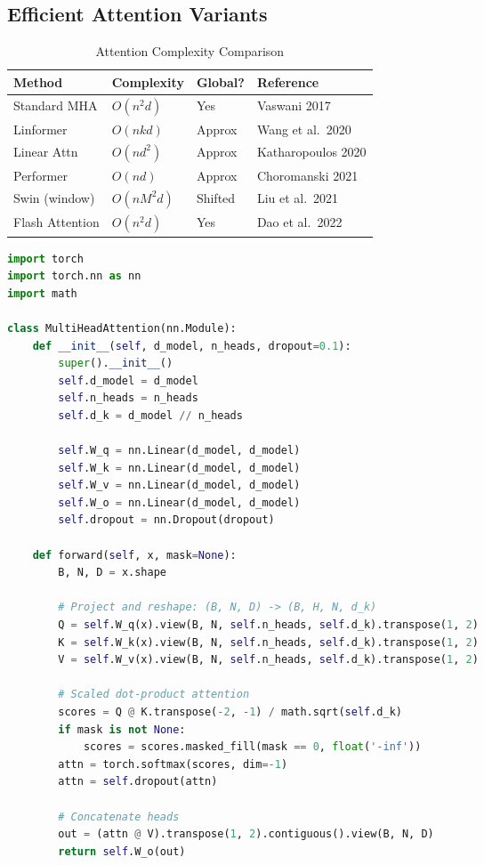 \subsection{Efficient Attention Variants}

\begin{table}[ht]
    \centering
    \caption{Attention Complexity Comparison}
    \begin{tabular}{L{3cm} L{3cm} L{3cm} L{3.5cm}}
        \toprule
        \textbf{Method} & \textbf{Complexity} & \textbf{Global?} & \textbf{Reference} \\
        \midrule
        Standard MHA & $O(n^2 d)$ & Yes & Vaswani 2017 \\
        Linformer & $O(nk d)$ & Approx & Wang et al.\ 2020 \\
        Linear Attn & $O(n d^2)$ & Approx & Katharopoulos 2020 \\
        Performer & $O(n d)$ & Approx & Choromanski 2021 \\
        Swin (window) & $O(n M^2 d)$ & Shifted & Liu et al.\ 2021 \\
        Flash Attention & $O(n^2 d)$ & Yes & Dao et al.\ 2022 \\
        \bottomrule
    \end{tabular}
\end{table}

\begin{code}
    \label{code:mha_pytorch}
\begin{lstlisting}[language=python]
import torch
import torch.nn as nn
import math

class MultiHeadAttention(nn.Module):
    def __init__(self, d_model, n_heads, dropout=0.1):
        super().__init__()
        self.d_model = d_model
        self.n_heads = n_heads
        self.d_k = d_model // n_heads
        
        self.W_q = nn.Linear(d_model, d_model)
        self.W_k = nn.Linear(d_model, d_model)
        self.W_v = nn.Linear(d_model, d_model)
        self.W_o = nn.Linear(d_model, d_model)
        self.dropout = nn.Dropout(dropout)
    
    def forward(self, x, mask=None):
        B, N, D = x.shape
        
        # Project and reshape: (B, N, D) -> (B, H, N, d_k)
        Q = self.W_q(x).view(B, N, self.n_heads, self.d_k).transpose(1, 2)
        K = self.W_k(x).view(B, N, self.n_heads, self.d_k).transpose(1, 2)
        V = self.W_v(x).view(B, N, self.n_heads, self.d_k).transpose(1, 2)
        
        # Scaled dot-product attention
        scores = Q @ K.transpose(-2, -1) / math.sqrt(self.d_k)
        if mask is not None:
            scores = scores.masked_fill(mask == 0, float('-inf'))
        attn = torch.softmax(scores, dim=-1)
        attn = self.dropout(attn)
        
        # Concatenate heads
        out = (attn @ V).transpose(1, 2).contiguous().view(B, N, D)
        return self.W_o(out)
\end{lstlisting}
\end{code}

